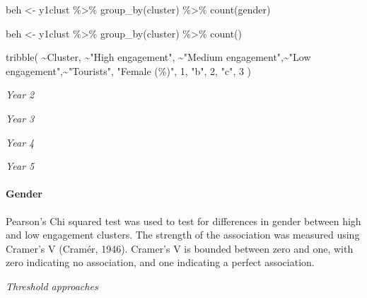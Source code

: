 \documentclass[
]{article}
\newenvironment{Shaded}{\begin{snugshade}}{\end{snugshade}}
\newcommand{\DecValTok}[1]{\textcolor[rgb]{0.00,0.00,0.81}{#1}}
\newcommand{\FunctionTok}[1]{\textcolor[rgb]{0.00,0.00,0.00}{#1}}
\newcommand{\NormalTok}[1]{#1}
\newcommand{\OtherTok}[1]{\textcolor[rgb]{0.56,0.35,0.01}{#1}}
\newcommand{\SpecialCharTok}[1]{\textcolor[rgb]{0.00,0.00,0.00}{#1}}
\newcommand{\StringTok}[1]{\textcolor[rgb]{0.31,0.60,0.02}{#1}}
\begin{document}
\begin{Shaded}
\begin{Highlighting}[]
\NormalTok{beh }\OtherTok{\textless{}{-}}\NormalTok{ y1clust }\SpecialCharTok{\%\textgreater{}\%}
  \FunctionTok{group\_by}\NormalTok{(cluster) }\SpecialCharTok{\%\textgreater{}\%}
  \FunctionTok{count}\NormalTok{(gender)}

\NormalTok{beh }\OtherTok{\textless{}{-}}\NormalTok{ y1clust }\SpecialCharTok{\%\textgreater{}\%}
  \FunctionTok{group\_by}\NormalTok{(cluster) }\SpecialCharTok{\%\textgreater{}\%}
  \FunctionTok{count}\NormalTok{()}



\FunctionTok{tribble}\NormalTok{(}
  \SpecialCharTok{\textasciitilde{}}\NormalTok{Cluster, }\SpecialCharTok{\textasciitilde{}}\StringTok{"High engagement"}\NormalTok{, }\SpecialCharTok{\textasciitilde{}}\StringTok{"Medium engagement"}\NormalTok{,}\SpecialCharTok{\textasciitilde{}}\StringTok{"Low engagement"}\NormalTok{,}\SpecialCharTok{\textasciitilde{}}\StringTok{"Tourists"}\NormalTok{,}
  \StringTok{"Female (\%)"}\NormalTok{,   }\DecValTok{1}\NormalTok{,}
  \StringTok{"b"}\NormalTok{,   }\DecValTok{2}\NormalTok{,}
  \StringTok{"c"}\NormalTok{,   }\DecValTok{3}
\NormalTok{)}
\end{Highlighting}
\end{Shaded}

\emph{Year 2}

\emph{Year 3}

\emph{Year 4}

\emph{Year 5}

\hypertarget{gender}{%
\paragraph{Gender}\label{gender}}

Pearson's Chi squared test was used to test for differences in gender
between high and low engagement clusters. The strength of the
association was measured using Cramer's V (Cramér, 1946). Cramer's V is
bounded between zero and one, with zero indicating no association, and
one indicating a perfect association.

\emph{Threshold approaches}
\end{document}
